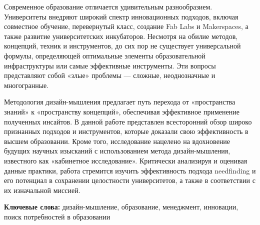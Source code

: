 Современное образование отличается удивительным разнообразием.
Университеты внедряют широкий спектр инновационных подходов, включая
совместное обучение, перевернутый класс, создание Fab Labs и
Makerspaces, а также развитие университетских инкубаторов. Несмотря на
обилие методов, концепций, техник и инструментов, до сих пор не
существует универсальной формулы, определяющей оптимальные элементы
образовательной инфраструктуры или самые эффективные инструменты. Эти
вопросы представляют собой «злые» проблемы --- сложные, неоднозначные и
многогранные.

Методология дизайн-мышления предлагает путь перехода от «пространства
знаний» к «пространству концепций», обеспечивая эффективное применение
полученных инсайтов. В данной работе представлен всесторонний обзор
широко признанных подходов и инструментов, которые доказали свою
эффективность в высшем образовании. Кроме того, исследование нацелено на
вдохновение будущих научных изысканий с использованием метода
дизайн-мышления, известного как «кабинетное исследование». Критически
анализируя и оценивая данные практики, работа стремится изучить
эффективность подхода needfinding и его потенциал в сохранении
целостности университетов, а также в соответствии с их изначальной
миссией.

{\bfseries Ключевые слова:} дизайн-мышление, образование, менеджмент,
инновации, поиск потребностей в образовании

